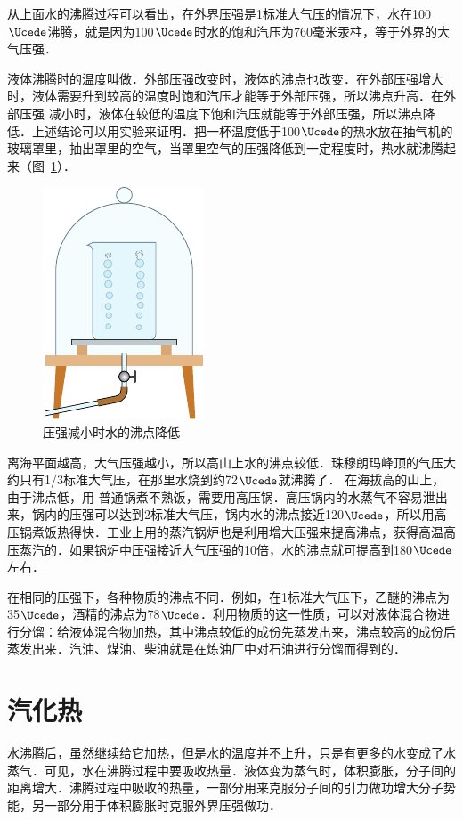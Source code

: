 从上面水的沸腾过程可以看出，在外界压强是1标准大气压的情况下，水在100$\Ucede$沸腾，就是因为100$\Ucede$时水的饱和汽压为760毫米汞柱，等于外界的大气压强．

液体沸腾时的温度叫做．外部压强改变时，液体的沸点也改变．在外部压强增大时，液体需要升到较高的温度时饱和汽压才能等于外部压强，所以沸点升高．在外部压强
减小时，液体在较低的温度下饱和汽压就能等于外部压强，所以沸点降低．上述结论可以用实验来证明．把一杯温度低于100$\Ucede$的热水放在抽气机的玻璃罩里，抽出罩里的空气，当罩里空气的压强降低到一定程度时，热水就沸腾起来（图~\ref{fig_B_5-7}）．
\begin{figure}[htbp]
  \centering
  \includegraphics{fig/B/5-7.pdf}
  \caption{压强减小时水的沸点降低}\label{fig_B_5-7}
\end{figure}

离海平面越高，大气压强越小，所以高山上水的沸点较低．珠穆朗玛峰顶的气压大约只有1/3标准大气压，在那里水烧到约72$\Ucede$就沸腾了．
在海拔高的山上，由于沸点低，用
普通锅煮不熟饭，需要用高压锅．高压锅内的水蒸气不容易泄出来，锅内的压强可以达到2标准大气压，锅内水的沸点接近120$\Ucede$，所以用高压锅煮饭热得快．工业上用的蒸汽锅炉也是利用增大压强来提高沸点，获得高温高压蒸汽的．如果锅炉中压强接近大气压强的10倍，水的沸点就可提高到180$\Ucede$左右．

在相同的压强下，各种物质的沸点不同．例如，在1标准大气压下，乙醚的沸点为35$\Ucede$，酒精的沸点为78$\Ucede$．利用物质的这一性质，可以对液体混合物进行分馏：给液体混合物加热，其中沸点较低的成份先蒸发出来，沸点较高的成份后蒸发出来．汽油、煤油、柴油就是在炼油厂中对石油进行分馏而得到的．

\section{汽化热}
水沸腾后，虽然继续给它加热，但是水的温度并不上升，只是有更多的水变成了水蒸气．可见，水在沸腾过程中要吸收热量．液体变为蒸气时，体积膨胀，分子间的距离增大．沸腾过程中吸收的热量，一部分用来克服分子间的引力做功增大分子势能，另一部分用于体积膨胀时克服外界压强做功．

